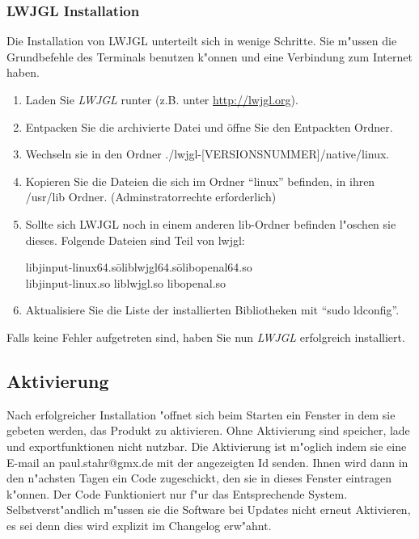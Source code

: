 \documentclass{scrartcl}
\begin{document}
\subsubsection{LWJGL Installation}
Die Installation von LWJGL unterteilt sich in wenige Schritte. Sie m"ussen die Grundbefehle des Terminals benutzen k"onnen und eine Verbindung zum Internet haben.
\begin{enumerate}
 \item Laden Sie \emph{LWJGL} runter (z.B. unter \url{http://lwjgl.org}).
 \item Entpacken Sie die archivierte Datei und \"offne Sie den Entpackten Ordner.
 \item Wechseln sie in den Ordner ./lwjgl-[VERSIONSNUMMER]/native/linux.
 \item Kopieren Sie die Dateien die sich im Ordner ``linux'' befinden, in ihren /usr/lib Ordner. (Adminstratorrechte erforderlich)
 \item Sollte sich LWJGL noch in einem anderen lib-Ordner befinden l"oschen sie dieses. Folgende Dateien sind Teil von lwjgl:
\begin{tabbing}
\glqq libjinput-linux64.so\grqq   \= \glqq liblwjgl64.so\grqq   \= \glqq libopenal64.so\grqq \\
\glqq libjinput-linux.so\grqq \> \glqq liblwjgl.so\grqq \> \glqq libopenal.so\grqq 
\end{tabbing}
 \item Aktualisiere Sie die Liste der installierten Bibliotheken mit ``sudo ldconfig''.
\end{enumerate}
Falls keine Fehler aufgetreten sind, haben Sie nun \emph{LWJGL} erfolgreich installiert. 
\subsection{Aktivierung}
Nach erfolgreicher Installation "offnet sich beim Starten ein Fenster in dem sie gebeten werden, das Produkt zu aktivieren. Ohne Aktivierung sind speicher, lade und exportfunktionen nicht nutzbar. Die Aktivierung ist m"oglich indem sie eine E-mail an paul.stahr@gmx.de mit der angezeigten Id senden. Ihnen wird dann in den n"achsten Tagen ein Code zugeschickt, den sie in dieses Fenster eintragen k"onnen. Der Code Funktioniert nur f"ur das Entsprechende System. Selbstverst"andlich m"ussen sie die Software bei Updates nicht erneut Aktivieren, es sei denn dies wird explizit im Changelog erw"ahnt.
\newpage
\end{document}
